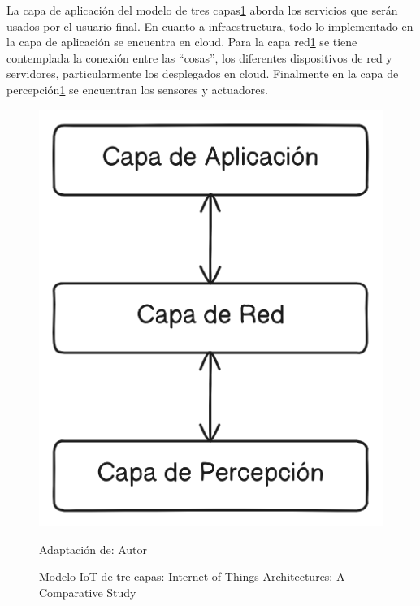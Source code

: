 \documentclass[stu,12pt,floatsintext]{apa7}
\begin{document}
	La capa de aplicación del modelo de tres capas\ref{iot_tres_capas} aborda los servicios que serán usados por el usuario final. En cuanto a infraestructura, todo lo implementado en la capa de aplicación se encuentra en cloud.
	Para la capa red\ref{iot_tres_capas} se tiene contemplada la conexión entre las ``cosas'', los diferentes dispositivos de red y servidores, particularmente los desplegados en cloud.
	Finalmente en la capa de percepción\ref{iot_tres_capas} se encuentran los sensores y actuadores.
		\begin{figure}[H]
		\centering
		\includegraphics[scale=0.3]{iot_modelo_3_capas}
		\captionsetup{justification=centering}
		\caption{Modelo IoT de tre capas: Internet of Things Architectures: A Comparative Study}
		\small
		\label{iot_tres_capas}
		Adaptación de: Autor
	\end{figure}
	
\end{document}
